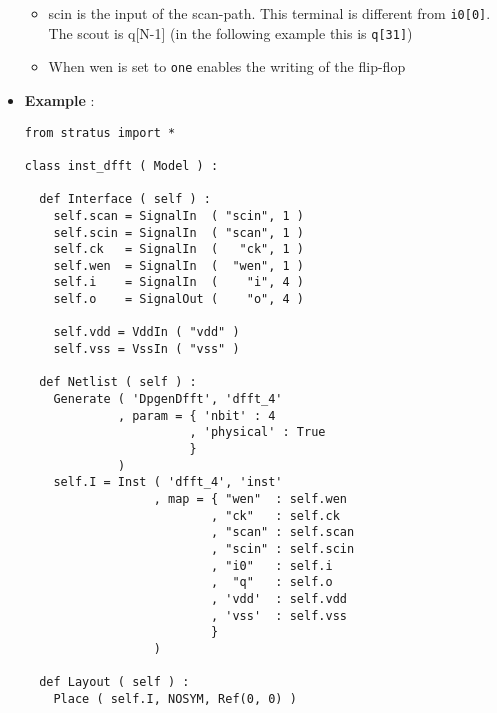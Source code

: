 \begin{itemize}
\begin{itemize}
        \item scin is the input of the scan-path. This terminal is different from \verb-i0[0]-. The scout is q[N-1] (in the following example this is \verb-q[31]-)
        \item When wen is set to \verb-one- enables the writing of the flip-flop
    \end{itemize}    
    \item \textbf{Example} :
\begin{verbatim}
from stratus import *

class inst_dfft ( Model ) :

  def Interface ( self ) :
    self.scan = SignalIn  ( "scin", 1 )
    self.scin = SignalIn  ( "scan", 1 )
    self.ck   = SignalIn  (   "ck", 1 )
    self.wen  = SignalIn  (  "wen", 1 )
    self.i    = SignalIn  (    "i", 4 )
    self.o    = SignalOut (    "o", 4 )

    self.vdd = VddIn ( "vdd" )
    self.vss = VssIn ( "vss" )
    
  def Netlist ( self ) :
    Generate ( 'DpgenDfft', 'dfft_4'
             , param = { 'nbit' : 4
                       , 'physical' : True
                       }
             )      
    self.I = Inst ( 'dfft_4', 'inst'
                  , map = { "wen"  : self.wen
                          , "ck"   : self.ck
                          , "scan" : self.scan
                          , "scin" : self.scin
                          , "i0"   : self.i
                          ,  "q"   : self.o
                          , 'vdd'  : self.vdd
                          , 'vss'  : self.vss
                          }
                  )
      
  def Layout ( self ) :
    Place ( self.I, NOSYM, Ref(0, 0) )
\end{verbatim}
\end{itemize}
